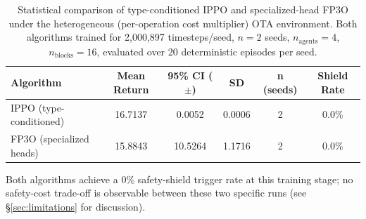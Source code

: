 %
%

\begin{table}[htbp]
\centering
\caption{Statistical comparison of type-conditioned IPPO and specialized-head
FP3O under the heterogeneous (per-operation cost multiplier) OTA environment.
Both algorithms trained for 2{,}000{,}897 timesteps/seed, $n=2$ seeds,
$n_{\text{agents}}=4$, $n_{\text{blocks}}=16$, evaluated over 20 deterministic
episodes per seed.}
\label{tab:ippo_vs_fp3o_hetero}

\begin{threeparttable}
\begin{tabular}{lccccc}
\toprule
\textbf{Algorithm} & \textbf{Mean Return} & \textbf{95\% CI ($\pm$)} & \textbf{SD} & \textbf{n (seeds)} & \textbf{Shield Rate} \\
\midrule
IPPO (type-conditioned)  & 16.7137 & 0.0052  & 0.0006 & 2 & 0.0\% \\
FP3O (specialized heads) & 15.8843 & 10.5264 & 1.1716 & 2 & 0.0\% \\
\bottomrule
\end{tabular}
\begin{tablenotes}
\footnotesize
\item Both algorithms achieve a 0\% safety-shield trigger rate at this training
stage; no safety-cost trade-off is observable between these two specific runs
(see \S\ref{sec:limitations} for discussion).
\end{tablenotes}
\end{threeparttable}

\bigskip


\end{table}

